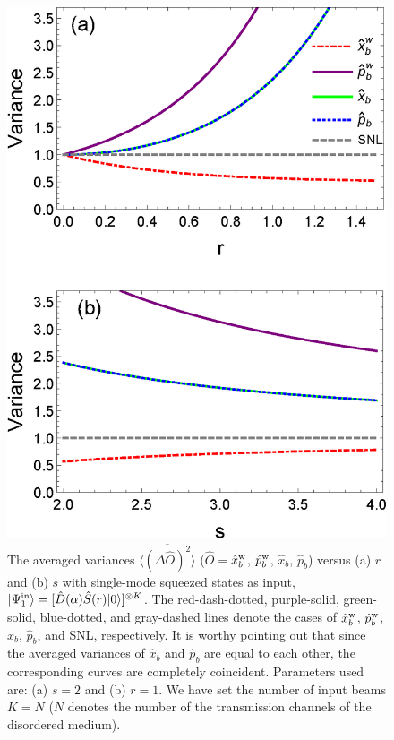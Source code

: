 \documentclass[9pt,twocolumn,twoside]{osajnl}
\begin{document}
\begin{figure}[htb]
\begin{center}
\includegraphics[width=.40\textwidth]{sqz1a20190830.eps} {}
\end{center}
\caption{The averaged variances $\overline{\langle (\Delta \hat{O})^2 \rangle}$ ($\hat{O} =$$\hat{x}_b^{\rm{w}}$, $\hat{p}_b^{\rm{w}}$, $\hat{x}_b$, $\hat{p}_b$) versus (a) $r$ and (b) $s$ with single-mode squeezed states as input, $| \Psi_1^{\rm{in}} \rangle = [\hat{D}(\alpha) \hat{S}(r) |0\rangle]^{\otimes K}$. The red-dash-dotted, purple-solid, green-solid, blue-dotted, and gray-dashed lines denote the cases of $\hat{x}_b^{\rm{w}}$, $\hat{p}_b^{\rm{w}}$, $\hat{x}_b$, $\hat{p}_b$, and SNL, respectively. It is worthy pointing out that since the averaged variances of $\hat{x}_b$ and $\hat{p}_b$ are equal to each other, the corresponding curves are completely coincident. Parameters used are: (a) $s = 2$ and (b) $r = 1$. We have set the number of input beams $K=N$ ($N$ denotes the number of the transmission channels of the disordered medium). }
\label{xr}
\end{figure}
\end{document}
